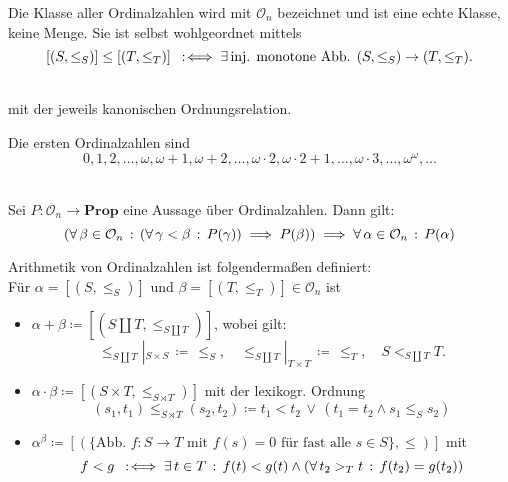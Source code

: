 \documentclass{cheat-sheet}
\newcommand{\Ord}{\mathcal{O}_n} %
\newcommand{\Prop}{\mathbf{Prop}} %
\begin{document}
\begin{bem}
  Die Klasse aller Ordinalzahlen wird mit $\Ord$ bezeichnet und ist eine echte Klasse, keine Menge.
  Sie ist selbst wohlgeordnet mittels
  \[ [(S, \leq_S)] \leq [(T, \leq_T)] \enspace:\!\iff \exists \, \text{inj. monotone Abb. $(S, \leq_S) \to (T, \leq_T)$}. \]
\end{bem}

\begin{nota}
  \inlineitem{$0 \coloneqq [\emptyset]$,} \enspace
   \enspace
  \inlineitem{$\omega \coloneqq [\N]$} \\
  mit der jeweils kanonischen Ordnungsrelation.
\end{nota}

\begin{bem}
  Die ersten Ordinalzahlen sind
  \[
    0, 1, 2, \ldots, \omega, \omega + 1, \omega + 2, \ldots, \omega \cdot 2, \omega \cdot 2 + 1, \ldots, \omega \cdot 3, \ldots, \omega^\omega, \ldots
  \]
\end{bem}

\begin{prinzip}\mbox{}\\
  Sei $P : \Ord \to \Prop$ eine Aussage über Ordinalzahlen. Dann gilt:
  \[ \left( \fa{\beta \in \Ord} (\fa{\gamma < \beta} P(\gamma)) \implies P(\beta) \right) \implies \fa{\alpha \in \Ord} P(\alpha) \]
\end{prinzip}

\begin{defn}
  Arithmetik von Ordinalzahlen ist folgendermaßen definiert: \\
  Für $\alpha = [(S, \leq_S)]$ und $\beta = [(T, \leq_T)] \in \Ord$ ist
  \begin{itemize}
    \item $\alpha + \beta \coloneqq [(S \amalg T, \leq_{S \amalg T})]$, wobei gilt:
    \[
      \leq_{S \amalg T}|_{S \times S} \,\coloneqq\, \leq_S, \quad
      \leq_{S \amalg T}|_{T \times T} \,\coloneqq\, \leq_T, \quad
      S <_{S \amalg T} T.
    \]
    \item $\alpha \cdot \beta \coloneqq [(S \times T, \leq_{S \rtimes T})]$ mit der lexikogr. Ordnung
    \[ (s_1, t_1) \leq_{S \rtimes T} (s_2, t_2) \coloneqq t_1 < t_2 \,\vee\, (t_1 = t_2 \wedge s_1 \leq_S s_2) \]
    \item $\alpha^\beta \coloneqq [(\{ \text{Abb. $f : S \to T$ mit $f(s) = 0$ für fast alle $s \in S$} \}, \leq)]$ mit
    \[ f < g \enspace:\!\iff \exists \, {t \in T} \,:\, f(t) < g(t) \wedge \left( \forall \, {t_2 >_T t} \,:\, f(t_2) = g(t_2) \right) \]
  \end{itemize}
\end{defn}
\end{document}
